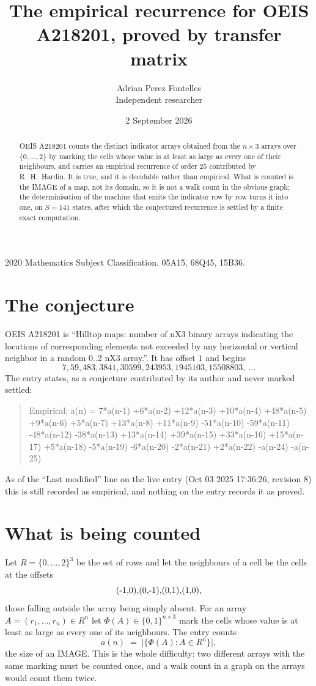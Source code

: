 \documentclass[11pt,a4paper]{article}
\title{The empirical recurrence for OEIS A218201, proved by transfer matrix}
\author{Adrian Perez Fontelles\\ \small Independent researcher}
\date{2 September 2026}
\theoremstyle{plain}
\theoremstyle{definition}
\begin{document}
\maketitle

\begin{abstract}
OEIS A218201 counts the distinct indicator arrays obtained from the $n\times3$ arrays over
$\{0,\dots,2\}$ by marking the cells whose value is at least as large as every one of their neighbours, and carries an
empirical recurrence of order $25$ contributed by R.~H.~Hardin. It is true, and it is
decidable rather than empirical. What is counted is the IMAGE of a map, not its domain, so it
is not a walk count in the obvious graph; the determinisation of the machine that emits the
indicator row by row turns it into one, on $S=141$ states, after which the conjectured
recurrence is settled by a finite exact computation.
\end{abstract}

\noindent\small 2020 Mathematics Subject Classification. 05A15, 68Q45, 15B36.\normalsize

\section{The conjecture}

OEIS A218201 is ``Hilltop maps: number of nX3 binary arrays indicating the locations of corresponding elements not exceeded by any horizontal or vertical neighbor in a random 0..2 nX3 array.''. It has offset $1$ and begins
\[
7, 59, 483, 3841, 30599, 243953, 1945103, 15508803,\ \dots
\]
The entry states, as a conjecture contributed by its author and never marked settled:
\begin{quote}
Empirical: a(n) = 7*a(n-1) +6*a(n-2) +12*a(n-3) +10*a(n-4) +48*a(n-5) +9*a(n-6) +5*a(n-7) +13*a(n-8) +11*a(n-9) -51*a(n-10) -59*a(n-11) -48*a(n-12) -38*a(n-13) +13*a(n-14) +39*a(n-15) +33*a(n-16) +15*a(n-17) +5*a(n-18) -5*a(n-19) -6*a(n-20) -2*a(n-21) +2*a(n-22) -a(n-24) -a(n-25)
\end{quote}
As of the ``Last modified'' line on the live entry (Oct 03 2025 17:36:26, revision 8) this is still
recorded as empirical, and nothing on the entry records it as proved.

\section{What is being counted}

Let $R=\{0,\dots,2\}^{3}$ be the set of rows and let the neighbours of a cell be the
cells at the offsets
\[
$(-1,0)$, $(0,-1)$, $(0,1)$, $(1,0)$,
\]
those falling outside the array being simply absent. For an array
$A=(r_1,\dots,r_n)\in R^n$ let $\Phi(A)\in\{0,1\}^{n\times3}$ mark the cells whose value
is at least as large as every one of its neighbours. The entry counts
\[
a(n)\;=\;\bigl|\{\Phi(A):A\in R^n\}\bigr| ,
\]
the size of an IMAGE. This is the whole difficulty: two different arrays with the same marking
must be counted once, and a walk count in a graph on the arrays would count them twice.
\end{document}
